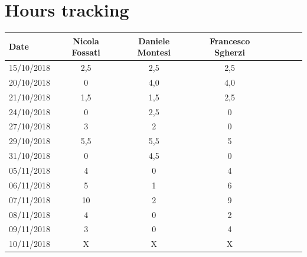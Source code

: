 \documentclass[a4paper,oneside,11pt]{article}
\begin{document}
        \section{Hours tracking}
        \begin{tabular}{l*{6}{c}r}
            Date & Nicola Fossati & Daniele Montesi & Francesco Sgherzi \\
            \hline
            15/10/2018 & 2,5 & 2,5 & 2,5   \\
            \hline
            20/10/2018 & 0 & 4,0 & 4,0 \\
            \hline
            21/10/2018 & 1,5 & 1,5 & 2,5 \\
            \hline
            24/10/2018 & 0 & 2,5 & 0 \\
             \hline
            27/10/2018 & 3 & 2 & 0 \\
             \hline
            29/10/2018 & 5,5 & 5,5 & 5 \\
             \hline
            31/10/2018 & 0 & 4,5 & 0 \\
             \hline
            05/11/2018 & 4 & 0 & 4 \\
            \hline
            06/11/2018 & 5 & 1 & 6 \\
            \hline
            07/11/2018 & 10 & 2 & 9 \\
             \hline
            08/11/2018 & 4 & 0 & 2 \\
            \hline
            09/11/2018 & 3 & 0 & 4 \\
            \hline
            10/11/2018 & X & X & X \\


        \end{tabular}
\end{document}
